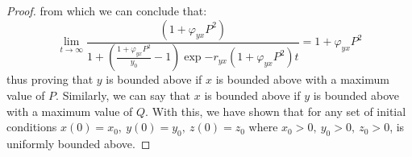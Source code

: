 \begin{proof}
    from which we can conclude that:
    \begin{equation*}
        \lim_{t\to\infty}\frac{\left(1+\varphi_{yx}P^2\right)}{1+\left(\frac{1+\varphi_{yx}P^2}{y_0}-1\right)\exp{-r_{yx}\left(1+\varphi_{yx}P^2\right)t}}=1+\varphi_{yx}P^2
    \end{equation*}
    thus proving that $y$ is bounded above if $x$ is bounded above with a maximum value of $P$.
    Similarly, we can say that $x$ is bounded above if $y$ is bounded above with a maximum value of $Q$.
    With this, we have shown that for any set of initial conditions $x(0)=x_0,\ y(0)=y_0,\ z(0)=z_0$ where $x_0>0,\ y_0>0,\ z_0>0$,  is uniformly bounded above.
\end{proof}
